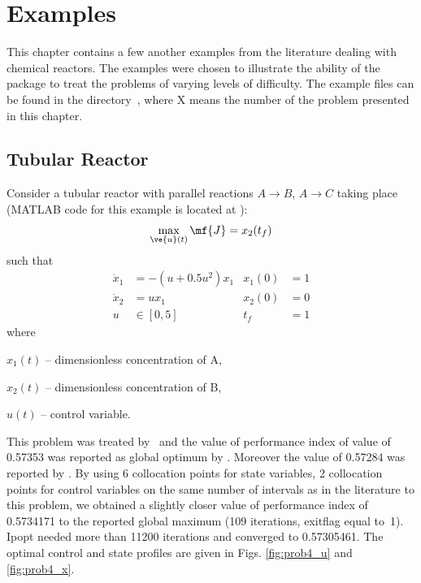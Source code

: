 \chapter{Examples}
\label{cha:examples}


This chapter contains a few another examples from the literature
dealing with chemical reactors. The examples were chosen to
illustrate the ability of the~ package to treat the
problems of varying levels of difficulty. The example files can be
found in the directory~, where X means the
number of the problem presented in this chapter.

\section{Tubular Reactor}
\label{sec:prob4}

Consider a tubular reactor with  parallel
reactions $A \rightarrow B$, $A \rightarrow C$ taking place
\citep{raj01,dad95,log89} (MATLAB code for this example is located
at ):
\begin{equation}
\max_{\ve{u}(t)} \mf{J} = x_{2}(t_{f}) \label{eq:tubular}
\end{equation}
such that
\begin{align*}
\dot{x}_1 &=-(u+0.5u^2)x_{1} &x_1(0) &= 1 \\
\dot{x}_2 &=ux_1 &x_2(0) &= 0 \\
u &\in [0,5] & t_f &=1
\end{align*}
where 
\begin{description}
\item $x_{1}(t)$ -- dimensionless concentration of A,
\item $x_{2}(t)$ -- dimensionless concentration of B,
\item $u(t)$ -- control variable.
\end{description}

This problem was treated by~\cite{dad95,log89,raj01} and the value of
performance index of value of 0.57353 was reported as global optimum
by \cite{dad95}. Moreover the value of 0.57284 was reported by
\cite{raj01}. By using 6 collocation points for state variables,
2 collocation points for control variables on the same number of
intervals as in the literature to this problem, we obtained a slightly
closer value of performance index of 0.5734171 to the reported global
maximum (109 iterations, exitflag equal to~1). Ipopt needed more than
11200 iterations and converged to 0.57305461.  
The optimal control
and state profiles are given in Figs. \ref{fig:prob4_u} and
\ref{fig:prob4_x}.

